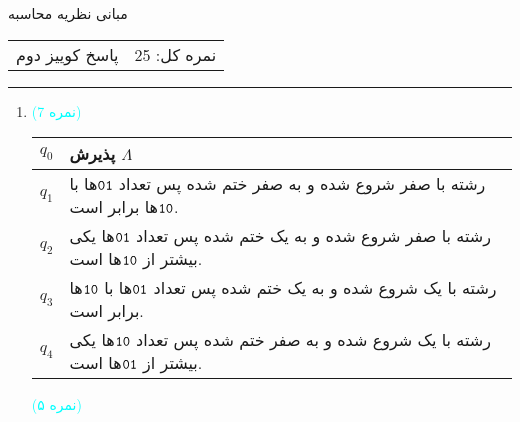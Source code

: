 \documentclass{article}
\begin{document}
	\begin{center}
		\Huge
		مبانی نظریه محاسبه
	\end{center}
	\Large
	\begin{tabularx}{\linewidth}{>{\raggedleft\arraybackslash}X>{\raggedright\arraybackslash}X}
		پاسخ کوییز  دوم
		&
		نمره کل: 25
	\end{tabularx}
	\rule{\textwidth}{1pt}
	\normalsize
	\begin{enumerate}
		\item 
		
		\textcolor{cyan}{
			(7 نمره)
		}
		
		\begin{minipage}{0.5\textwidth}
			\begin{tabularx}{\linewidth}{|c|X|}
				\hline
				$q_0$ &					
پذیرش $\Lambda$ 
				\\ \hline
				$q_1$ &					
رشته با صفر شروع شده و به صفر ختم شده پس تعداد $ \tt 01 $ها با $\tt 10 $ها برابر است.
				\\ \hline
				$q_2$ &			
رشته با صفر شروع شده و به یک ختم شده پس تعداد $ \tt 01 $ها یکی بیشتر از $\tt 10 $ها است.
				\\ \hline
				$q_3$ &				
رشته با یک شروع شده و به یک ختم شده پس تعداد $ \tt 01 $ها با $\tt 10 $ها برابر است.
				\\ \hline
				$q_4$ &					
رشته با یک شروع شده و به صفر ختم شده پس تعداد $\tt 10 $ها یکی بیشتر از $ \tt 01 $ها است.
				\\ \hline
			\end{tabularx}
		\end{minipage}
		\begin{minipage}{0.5\textwidth}
		\end{minipage}
		\begin{center}
			\textcolor{cyan}{
				(۵ نمره)
			}
		\end{center}


\end{enumerate}
\end{document}
